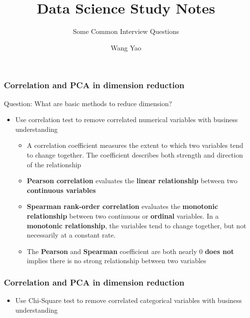 \documentclass[11pt]{beamer}
\author{Wang Yao}
\begin{document}
	\title{Data Science Study Notes}
	\subtitle{Some Common Interview Questions}
	\begin{frame}[plain]
	\maketitle
\end{frame}

\begin{frame}
\frametitle{Correlation and PCA in dimension reduction}
\begin{block}{Question:}
	What are basic methods to reduce dimension?
\end{block}
\begin{itemize}
	\item Use correlation test to remove correlated numerical variables with business understanding
	\begin{itemize}
		\item A correlation coefficient measures the extent to which two variables tend to change together. The coefficient describes both  strength and direction of the relationship
		\item \textbf{Pearson correlation} evaluates the \textbf{linear relationship} between two \textbf{continuous variables}
		\item \textbf{Spearman rank-order correlation} evaluates the \textbf{monotonic relationship} between two continuous or \textbf{ordinal} variables. In a \textbf{monotonic relationship}, the variables tend to change together, but not necessarily at a constant rate. 
		\item The \textbf{Pearson} and \textbf{Spearman} coefficient are both nearly $0$ \textbf{does not} implies there is no strong relationship between two variables
	\end{itemize}
\end{itemize}
\end{frame}

\begin{frame}
\frametitle{Correlation and PCA in dimension reduction}
\begin{itemize}
	\item  Use Chi-Square test to remove correlated categorical variables with business understanding
\end{itemize}
\end{frame}
\end{document}
